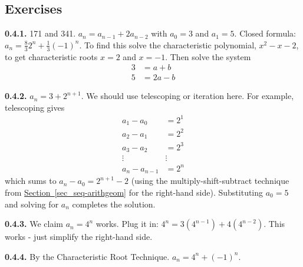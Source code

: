 \documentclass[10pt,]{book}
\theoremstyle{plain}
\theoremstyle{definition}
\theoremstyle{definition}
\theoremstyle{definition}
\theoremstyle{definition}
\numberwithin{equation}{chapter}
\newcommand{\amp}{&}
\begin{document}
\subsection*{ Exercises}
\noindent\textbf{0.4.1.} \hypertarget{p-343}{}%
171 and 341. \(a_n = a_{n-1} + 2a_{n-2}\) with \(a_0 = 3\) and \(a_1 = 5\). Closed formula: \(a_n = \frac{8}{3}2^n + \frac{1}{3}(-1)^n\).  To find this solve the characteristic polynomial, \(x^2 - x - 2\), to get characteristic roots \(x = 2\) and \(x=-1\).  Then solve the system%
\begin{align*}
3 \amp = a + b\\
5 \amp = 2a - b
\end{align*}
%
\par\smallskip
\noindent\textbf{0.4.2.} \hypertarget{p-345}{}%
\(a_n = 3 + 2^{n+1}\).  We should use telescoping or iteration here.  For example, telescoping gives%
\begin{align*}
a_1 - a_0 \amp = 2^1\\
a_2 - a_1 \amp = 2^2\\
a_3 - a_2 \amp = 2^3\\
\vdots\amp \vdots \\
a_n - a_{n-1} \amp = 2^n
\end{align*}
which sums to \(a_n - a_0 = 2^{n+1} - 2\) (using the multiply-shift-subtract technique from \hyperref[sec_seq-arithgeom]{Section~\ref{sec_seq-arithgeom}} for the right-hand side).  Substituting \(a_0 = 5\) and solving for \(a_n\) completes the solution.%
\par\smallskip
\noindent\textbf{0.4.3.} \hypertarget{p-347}{}%
We claim \(a_n = 4^n\) works. Plug it in: \(4^n = 3(4^{n-1}) + 4(4^{n-2})\). This works - just simplify the right-hand side.%
\par\smallskip
\noindent\textbf{0.4.4.} \hypertarget{p-349}{}%
By the Characteristic Root Technique. \(a_n = 4^n + (-1)^n\).%
\par\smallskip
\end{document}
